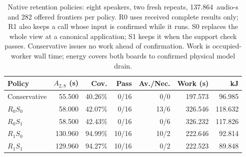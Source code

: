 \begin{table}[t]
\centering
\caption{Native retention policies: eight speakers, two fresh repeats,
137.864~audio-s and 282 offered frontiers per policy. R0 uses received
complete results only; R1 also keeps a call whose input is confirmed
while it runs. S0 replaces the whole view at a canonical application;
S1 keeps it when the support check passes. Conservative issues no work
ahead of confirmation. Work is occupied-worker wall time; energy covers
both boards to confirmed physical model drain.}
\label{tab:native_confirmation_v16}
\scriptsize\setlength{\tabcolsep}{2.4pt}
\begin{tabular}{@{}lrrrrrr@{}}
\toprule
Policy & $A_{2,8}$ (s) & Cov. & Pass & Av./Nec. & Work (s) & kJ\\
\midrule
Conservative & 55.500 & 40.26\% & 0/16 & 0/0 & 197.573 & 96.985\\
$R_0S_0$ & 58.000 & 42.07\% & 0/16 & 13/6 & 326.546 & 118.632\\
$R_0S_1$ & 58.500 & 42.43\% & 0/16 & 0/6 & 326.232 & 117.826\\
$R_1S_0$ & 130.960 & 94.99\% & 10/16 & 10/2 & 222.646 & 92.814\\
$R_1S_1$ & 129.960 & 94.27\% & 10/16 & 0/2 & 222.523 & 89.848\\
\bottomrule
\end{tabular}
\end{table}
